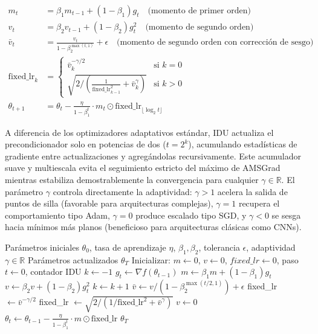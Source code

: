 \begin{align}
m_t &= \beta_1 m_{t-1} + (1-\beta_1) g_t \quad\text{(momento de primer orden)}\\
v_t &= \beta_2 v_{t-1} + (1-\beta_2) g_t^2 \quad\text{(momento de segundo orden)}\\
\bar{v}_t &= \frac{v_t}{1-\beta_2^{\max(t,1)}} + \epsilon \quad\text{(momento de segundo orden con corrección de sesgo)}\\
\text{fixed\_lr}_k &= \begin{cases}
\bar{v}_k^{-\gamma/2} & \text{si } k = 0 \\
\sqrt{2 / \left(\frac{1}{\text{fixed\_lr}_{k-1}^2} + \bar{v}_k^\gamma\right)} & \text{si } k > 0
\end{cases}\\
\theta_{t+1} &= \theta_t - \frac{\eta}{1-\beta_1^t} \cdot m_t \odot \text{fixed\_lr}_{\lfloor\log_2 t\rfloor}
\end{align}

A diferencia de los optimizadores adaptativos estándar, IDU actualiza el precondicionador solo en potencias de dos ($t = 2^k$), acumulando estadísticas de gradiente entre actualizaciones y agregándolas recursivamente. Este acumulador suave y multiescala evita el seguimiento estricto del máximo de AMSGrad mientras estabiliza demostrablemente la convergencia para cualquier $\gamma \in \mathbb{R}$. El parámetro $\gamma$ controla directamente la adaptividad: $\gamma > 1$ acelera la salida de puntos de silla (favorable para arquitecturas complejas), $\gamma = 1$ recupera el comportamiento tipo Adam, $\gamma = 0$ produce escalado tipo SGD, y $\gamma < 0$ se sesga hacia mínimos más planos (beneficioso para arquitecturas clásicas como CNNs).

\begin{algorithm}[H]
\caption{Anon (Adaptivity Non-restricted Optimizer con IDU)}
\label{alg:anon}
\begin{algorithmic}[1]
\Require Parámetros iniciales $\theta_0$, tasa de aprendizaje $\eta$, $\beta_1, \beta_2$, tolerancia $\epsilon$, adaptividad $\gamma \in \mathbb{R}$
\Ensure Parámetros actualizados $\theta_T$
\State Inicializar: $m \gets 0$, $v \gets 0$, $fixed\_lr \gets 0$, paso $t \gets 0$, contador IDU $k \gets -1$
    \State $g_t \gets \nabla f(\theta_{t-1})$
    \State $m \gets \beta_1 m + (1-\beta_1) g_t$
    \State $v \gets \beta_2 v + (1-\beta_2) g_t^2$
        \State $k \gets k+1$
        \State $\bar{v} \gets v/(1 - \beta_2^{\max(t/2,1)}) + \epsilon$
            \State fixed\_lr $\gets \bar{v}^{-\gamma/2}$
        \Else
            \State fixed\_lr $\gets \sqrt{2 / (1/\text{fixed\_lr}^2 + \bar{v}^\gamma)}$
        \EndIf
        \State $v \gets 0$
    \EndIf
    \State $\theta_t \gets \theta_{t-1} - \frac{\eta}{1-\beta_1^t} \cdot m \odot \text{fixed\_lr}$
\EndFor
\Return $\theta_T$
\end{algorithmic}
\end{algorithm}

